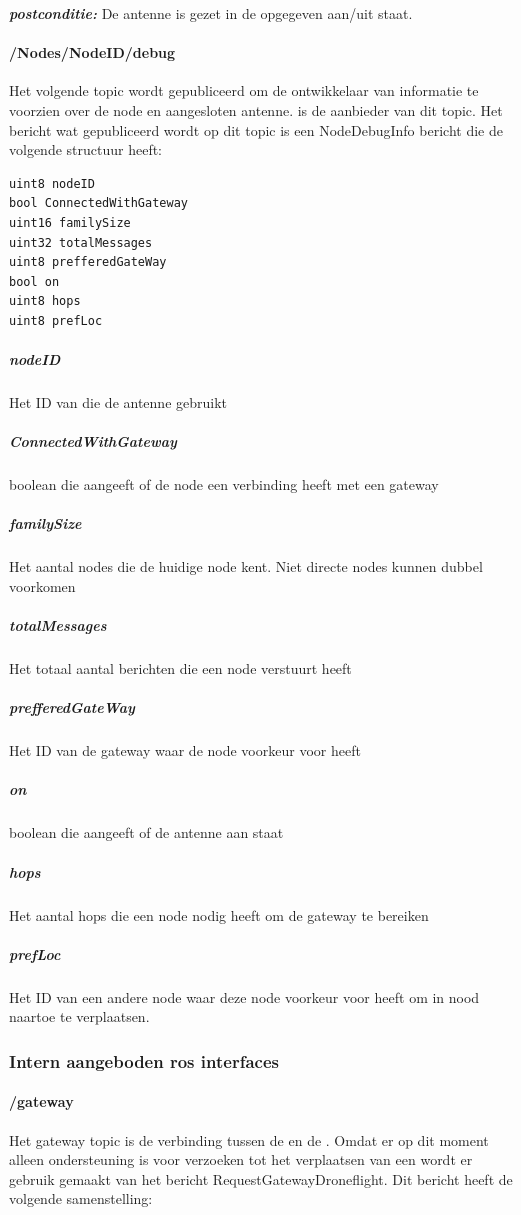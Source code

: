 \documentclass[a4paper, 11pt, oneside]{report}
\begin{document}
\textbf{\textit{postconditie:}} De antenne is gezet in de opgegeven aan/uit staat.

\paragraph{/Nodes/NodeID/debug}
\label{DetailedDesign:ros:extern:rosinterfaces:topic:debug}

Het volgende topic wordt gepubliceerd om de ontwikkelaar van informatie te voorzien over de node en aangesloten antenne.
 is de aanbieder van dit topic.
Het bericht wat gepubliceerd wordt op dit topic is een NodeDebugInfo bericht die de volgende structuur heeft:
\begin{lstlisting}
uint8 nodeID
bool ConnectedWithGateway 
uint16 familySize
uint32 totalMessages
uint8 prefferedGateWay
bool on
uint8 hops
uint8 prefLoc
\end{lstlisting}

\subparagraph{nodeID} Het ID van die de antenne gebruikt 
\subparagraph{ConnectedWithGateway} boolean die aangeeft of de node een verbinding heeft met een gateway
\subparagraph{familySize} Het aantal nodes die de huidige node kent. Niet directe nodes kunnen dubbel voorkomen
\subparagraph{totalMessages} Het totaal aantal berichten die een node verstuurt heeft
\subparagraph{prefferedGateWay} Het ID van de gateway waar de node voorkeur voor heeft
\subparagraph{on} boolean die aangeeft of de antenne aan staat
\subparagraph{hops} Het aantal hops die een node nodig heeft om de gateway te bereiken
\subparagraph{prefLoc} Het ID van een andere node waar deze node voorkeur voor heeft om in nood naartoe te verplaatsen. 

\subsubsection{Intern aangeboden ros interfaces}
\label{DetailedDesign:ros:intern:rosinterfaces}

\paragraph{/gateway}
\label{DetailedDesign:ros:intern:rosinterfaces:topic:gateway}
Het gateway topic is de verbinding tussen de  en de .
Omdat er op dit moment alleen ondersteuning is voor verzoeken tot het verplaatsen van een wordt er gebruik gemaakt van het bericht RequestGatewayDroneflight.
Dit bericht heeft de volgende samenstelling:
\end{document}
